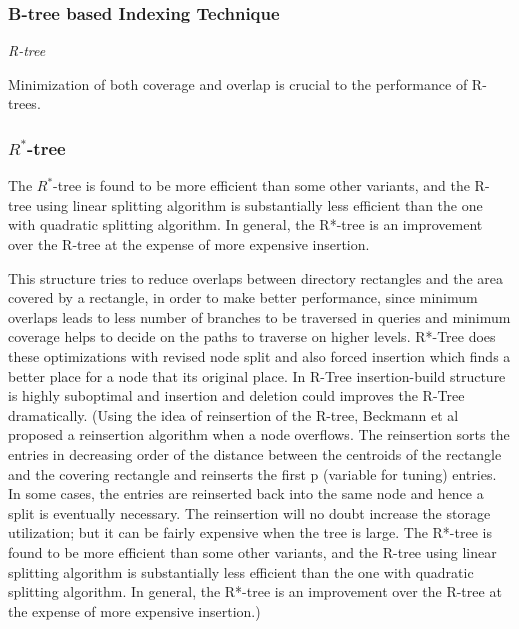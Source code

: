 \documentclass[a4paper,12pt]{article}
\begin{document}
\subsubsection{B-tree based Indexing Technique}
\emph{R-tree}
\label{rtree}

Minimization of both coverage and overlap is crucial to the performance of R-trees.
\subsubsection{$R^*$-tree}
The $R^*$-tree is found to be more efficient than some other variants, and the R-tree using linear splitting algorithm is substantially less efficient than the one with quadratic splitting algorithm. In general, the R*-tree is an improvement over the R-tree at the expense of more expensive insertion.

This structure tries to reduce overlaps between directory rectangles and the area covered by a rectangle, in order to make better performance, since minimum overlaps leads to less number of branches to be traversed in queries and minimum coverage helps to decide on the paths to traverse on higher levels. 
R*-Tree does these optimizations with revised node split and also forced insertion which finds a better place for a node that its original place. In R-Tree insertion-build structure is highly suboptimal and insertion and deletion could improves the R-Tree dramatically.
 (Using the idea of reinsertion of the R-tree, Beckmann et al proposed a reinsertion algorithm when a node overflows. The reinsertion sorts the entries in decreasing order of the distance between the centroids of the rectangle and the covering rectangle and reinserts the first p (variable for tuning) entries. In some cases, the entries are reinserted back into the same node and hence a split is eventually necessary. The reinsertion will no doubt increase the storage utilization; but it can be fairly expensive when the tree is large. The R*-tree is found to be more efficient than some other variants, and the R-tree using linear splitting algorithm is substantially less efficient than the one with quadratic splitting algorithm. In general, the R*-tree is an improvement over the R-tree at the expense of more expensive insertion.)
\end{document}
